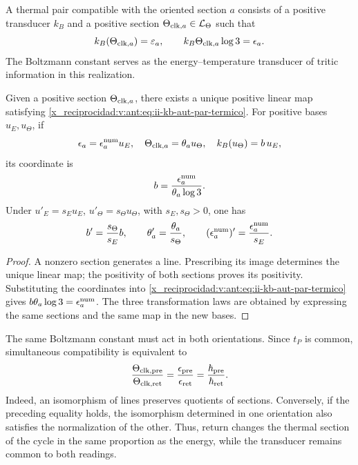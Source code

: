 \begin{definition}
A thermal pair compatible with the oriented section \(a\) consists of
a positive transducer \(k_B\) and a positive section
\(\Theta_{{\rm clk},a}\in\mathcal L_\Theta\) such that
\begin{equation}
 k_B(\Theta_{{\rm clk},a})=\varepsilon_a,
 \qquad
 k_B\Theta_{{\rm clk},a}\log3=\epsilon_a.
 \label{x_reciprocidad:v:ant:eq:ii-kb-aut-par-termico}
\end{equation}
The Boltzmann constant serves as the energy--temperature
transducer of tritic information in this realization.
\end{definition}

\begin{theorem}
Given a positive section \(\Theta_{{\rm clk},a}\), there exists a
unique positive linear map satisfying
\eqref{x_reciprocidad:v:ant:eq:ii-kb-aut-par-termico}. For positive bases \(u_E,u_\Theta\),
if
\[
 \epsilon_a=\epsilon_a^{\rm num}u_E,\quad
 \Theta_{{\rm clk},a}=\theta_a u_\Theta,\quad
 k_B(u_\Theta)=b\,u_E,
\]
its coordinate is
\begin{equation}
 b=\frac{\epsilon_a^{\rm num}}{\theta_a\log3}.
 \label{x_reciprocidad:v:ant:eq:ii-kb-aut-coordenada}
\end{equation}
Under \(u'_E=s_Eu_E\), \(u'_\Theta=s_\Theta u_\Theta\), with
\(s_E,s_\Theta>0\), one has
\[
 b'=\frac{s_\Theta}{s_E}b,\qquad
 \theta'_a=\frac{\theta_a}{s_\Theta},\qquad
 (\epsilon_a^{\rm num})'=\frac{\epsilon_a^{\rm num}}{s_E}.
\]
\end{theorem}
\begin{proof}
A nonzero section generates a line. Prescribing its image determines
the unique linear map; the positivity of both sections proves
its positivity. Substituting the coordinates into
\eqref{x_reciprocidad:v:ant:eq:ii-kb-aut-par-termico} gives
\(b\theta_a\log3=\epsilon_a^{\rm num}\). The three transformation
laws are obtained by expressing the same sections and the same
map in the new bases.
\end{proof}

The same Boltzmann constant must act in both orientations.
Since \(t_P\) is common, simultaneous compatibility is equivalent to
\begin{equation}
 \frac{\Theta_{{\rm clk},{\rm pre}}}{\Theta_{{\rm clk},{\rm ret}}}
 =\frac{\epsilon_{\rm pre}}{\epsilon_{\rm ret}}
 =\frac{\hbar_{\rm pre}}{\hbar_{\rm ret}}.
 \label{x_reciprocidad:v:ant:eq:ii-kb-aut-orientaciones}
\end{equation}
Indeed, an isomorphism of lines preserves quotients of sections.
Conversely, if the preceding equality holds, the isomorphism
determined in one orientation also satisfies the normalization of
the other. Thus, return changes the thermal section of the cycle in the
same proportion as the energy, while the transducer remains
common to both readings.

